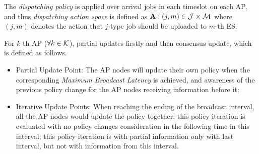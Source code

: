 The \emph{dispatching policy} is applied over arrival jobs in each timeslot on each AP, and thus \emph{dispatching action space} is defined as $\mathbf{A}: (j, m) \in \mathcal{J} \times \mathcal{M}$ where $(j, m)$ denotes the action that $j$-type job should be uploaded to $m$-th ES.
\begin{definition}
    For $k$-th AP ($\forall k\in\mathcal{K}$), partial updates firstly and then consensus update, which is defined as follows.
    \begin{itemize}
        \item Partial Update Point: The AP nodes will update their own policy when the corresponding \emph{Maximum Broadcast Latency} is achieved, and awareness of the previous policy change for the AP nodes receiving information before it;
        \item Iterative Update Points: When reaching the ending of the broadcast interval, all the AP nodes would update the policy together;
        this policy iteration is evaluated with no policy changes consideration in the following time in this interval;
        this policy iteration is with partial information only with last interval, but not with information from this interval.
    \end{itemize}
\end{definition}
        
